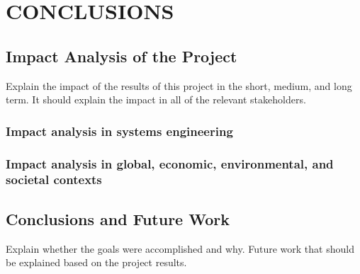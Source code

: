 \chapter{CONCLUSIONS}

\section{Impact Analysis of the Project}

Explain the impact of the results of this project in the short, medium, and long term. It should explain the impact in all of the relevant stakeholders.

\subsection{Impact analysis in systems engineering}

\subsection{Impact analysis in global, economic, environmental, and societal contexts}

\section{Conclusions and Future Work}

Explain whether the goals were accomplished and why. Future work that should be explained based on the project results.
